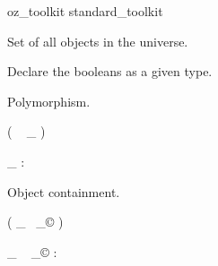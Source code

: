 \begin{zsection}
  \SECTION oz\_toolkit \parents standard\_toolkit
\end{zsection}









Set of all objects in the universe.

\begin{zed}
  [\oid]
\end{zed}

Declare the booleans as a given type.

\begin{zed}
  [\bool]
\end{zed}

Polymorphism.

\begin{zed}
  \function ( \poly ~ \_ )
\end{zed}

\begin{gendef}[X]
  \poly \_ : \power \oid \fun \power \oid
\end{gendef}

Object containment.

\begin{zed}
  \function ( \_ ~_{\copyright} )
\end{zed}

\begin{gendef}[X]
  \_ ~ _{\copyright} : \power \oid \fun \power \oid
\end{gendef}
